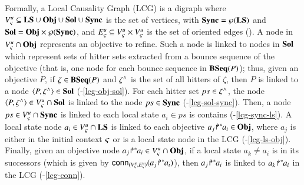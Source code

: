 Formally, a Local Causality Graph (LCG)
is a digraph where $V_\varsigma^u \subseteq \mathbf{LS}\cup \mathbf{Obj} \cup \mathbf{Sol} \cup \mathbf{Sync}$ is the set of vertices,
with $\mathbf{Sync}=\wp(\mathbf{LS})$ and $\mathbf{Sol}=\mathbf{Obj}\times\wp(\mathbf{Sync})$,
and $E_\varsigma^u \subseteq V_\varsigma^u \times V_\varsigma^u$ is the set of oriented edges
().
% 
A node in $V_\varsigma^u\cap\mathbf{Obj}$ represents an objective to refine.
Such a node is linked to nodes in $\mathbf{Sol}$ which represent
sets of hitter sets extracted from a
bounce sequence of the objective
(that is, one node for each bounce sequence in $\mathbf{BSeq}(P)$); thus,
given an objective $P$, if $\zeta\in\mathbf{BSeq}(P)$
and $\zeta^\wedge$ is the set of all hitters of $\zeta$,
then $P$ is linked to a node $\langle P, \zeta^\wedge\rangle\in\mathbf{Sol}$
(\nobreakdash-\ref{lcg-obj-sol}).
For each hitter set $ps\in\zeta^\wedge$,
the node $\langle P,\zeta^\wedge\rangle\in V_\varsigma^u\cap\mathbf{Sol}$ is
linked to the node $ps\in\mathbf{Sync}$
(\nobreakdash-\ref{lcg-sol-sync}).
Then, a node $ps\in V_\varsigma^u\cap\mathbf{Sync}$ is linked to each local state $a_i \in ps$ is contains
(\nobreakdash-\ref{lcg-sync-ls}).
A local state node $a_i\in V_\varsigma^u\cap\mathbf{LS}$
is linked to each objective ${a_j\!\Rsh^*\!\!a_i} \in \mathbf{Obj}$, where
$a_j$ is either in the initial context $\varsigma$ or
is a local state node in the LCG
(\nobreakdash-\ref{lcg-ls-obj}).
Finally, given an objective node ${a_j\!\Rsh^*\!\!a_i}\in V_\varsigma^u\cap\mathbf{Obj}$,
if a local state $a_k\neq a_i$ is in its successors (which is given by
$\mathsf{conn}_{({V_\varsigma^u},{E_\varsigma^u})}({a_j\!\Rsh^*\!\!a_i})$), then
${a_j\!\Rsh^*\!\!a_i}$ is linked to ${a_k\!\Rsh^*\!\!a_i}$ in the LCG
(\nobreakdash-\ref{lcg-conn}).

